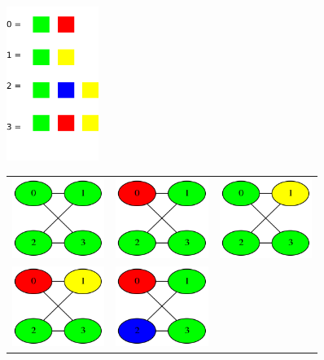 \documentclass{article}
\theoremstyle{definition}
\theoremstyle{remark}
\begin{document}
\begin{figure}
    \centering
    \begin{minipage}{0.29\textwidth}
        \includegraphics[width=3cm]{examples/4/1/example4_1_title.png}
    \end{minipage}
    \begin{minipage}{0.70\textwidth}
        \begin{tabular}{ccc}
            \includegraphics[width=3cm]{examples/4/1/example4_1_0.png} &
            \includegraphics[width=3cm]{examples/4/1/example4_1_1.png} &
            \includegraphics[width=3cm]{examples/4/1/example4_1_2.png} \\
            \includegraphics[width=3cm]{examples/4/1/example4_1_3.png} &
            \includegraphics[width=3cm]{examples/4/1/example4_1_4.png} &

\end{tabular}
\end{minipage}
\end{figure}
\end{document}

